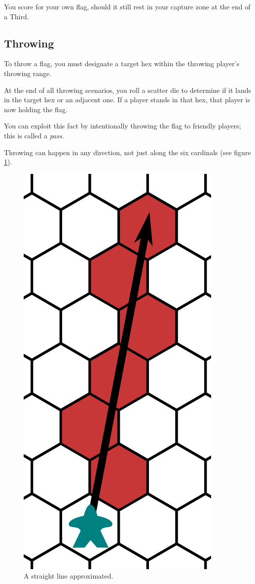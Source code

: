 \begin{note}
    You score for your own flag, should it still rest in your capture zone at the end of a Third.
\end{note}

\subsection{Throwing}\label{throwing}
To throw a flag, you must designate a target hex within the throwing player's throwing range.

At the end of all throwing scenarios, you roll a scatter die to determine if it lands in the target hex or an adjacent one. 
If a player stands in that hex, that player is now holding the flag.

You can exploit this fact by intentionally throwing the flag to friendly players; this is called a \textit{pass}.

\begin{note}
    Throwing can happen in any direction, not just along the six cardinals (see figure \ref{fig:line-throw}).
\end{note}

\begin{figure}
    \centering
    \includegraphics{graphics/throwing-cropped.png}
    \caption{A straight line approximated.}
    \label{fig:line-throw}
\end{figure}

